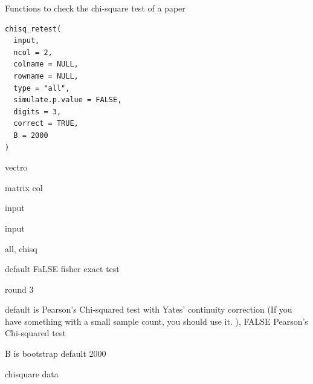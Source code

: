 \documentclass[a4paper]{book}
\begin{document}
%
\begin{Description}
Functions to check the chi-square test of a paper
\end{Description}
%
\begin{Usage}
\begin{verbatim}
chisq_retest(
  input,
  ncol = 2,
  colname = NULL,
  rowname = NULL,
  type = "all",
  simulate.p.value = FALSE,
  digits = 3,
  correct = TRUE,
  B = 2000
)
\end{verbatim}
\end{Usage}
%
\begin{Arguments}
\begin{ldescription}
\item[\code{input}] vectro

\item[\code{ncol}] matrix col

\item[\code{colname}] input

\item[\code{rowname}] input

\item[\code{type}] all, chisq

\item[\code{simulate.p.value}] default FaLSE fisher exact test

\item[\code{digits}] round 3

\item[\code{correct}] default is Pearson’s Chi-squared test with Yates’ continuity correction (If you have something with a small sample count, you should use it. ), FALSE Pearson's Chi-squared test

\item[\code{B}] B is bootstrap default 2000
\end{ldescription}
\end{Arguments}
%
\begin{Value}
chisquare data
\end{Value}
%
\end{document}

